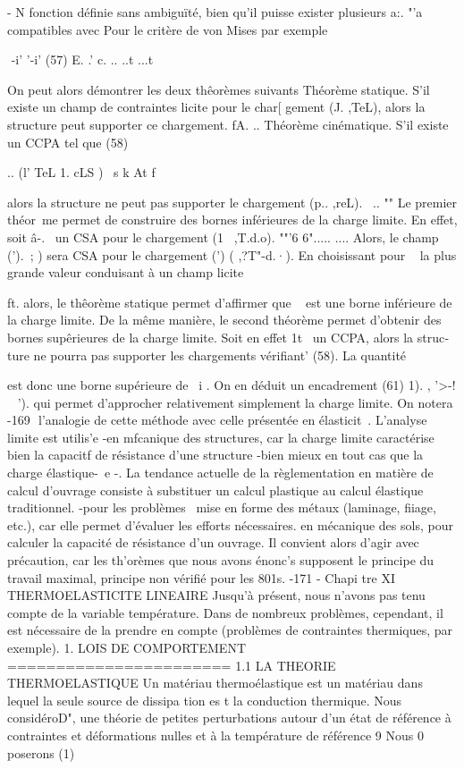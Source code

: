 {{{{{{{{{{{{{{{{-
N
fonction définie sans ambiguïté, bien qu'il puisse exister plusieurs a:. 
"'a
compatibles avec Pour le critère de von Mises par exemple 

 -i' '-i'
(57) 
E. .' c. .. 
..t ...t 

On peut alors démontrer les deux thêorèmes suivants 
Théorème statique. S'il existe un champ de contraintes licite pour le char­[ gement (J. ,TeL), alors la structure peut supporter ce chargement.
fA. .. 
Théorème cinématique. S'il existe un CCPA tel que 
(58) 

.. (l' TeL 1. cLS )
~s k At 
f 

alors la structure ne peut pas supporter le chargement (p.. ,reL). 
~.. "" 
Le premier théor~me permet de construire des bornes inférieures de la charge limite. En effet, soit â-.~ un CSA pour le chargement (1~ ,T.d.o).
""'6 6"..... .... 
Alors, le champ (').~; ) sera CSA pour le chargement (') ( ,?T"-d.·). En choisissant pour ~ la plus grande valeur conduisant à un champ licite 

ft. 
alors, le thêorème statique permet d'affirmer que ~ est une borne inférieu­re de la charge limite. 
De la même manière, le second théorème permet d'obtenir des bornes supêrieures de la charge limite. Soit en effet 1t~ un CCPA, alors la struc­ture ne pourra pas supporter les chargements vérifiant' (58). La quantité 

est donc une borne supérieure de ~i . On en déduit un encadrement 
(61) 1). , '>-! ~ '). 
qui permet d'approcher relativement simplement la charge limite. On notera 
-169 ­
l'analogie de cette méthode avec celle présentée en élasticit~. 
L'analyse limite est utilis'e 
-en mfcanique des structures, car la charge limite caractérise bien la capacitf de résistance d'une structure -bien mieux en tout cas que la charge élastique-~e -. La tendance actuelle de la règlementation en matiè­re de calcul d'ouvrage consiste à substituer un calcul plastique au calcul élastique traditionnel. 
-pour les problèmes ~mise en forme des métaux (laminage, fiiage, etc.), car elle permet d'évaluer les efforts nécessaires. 
en mécanique des sols, pour calculer la capacité de résistance d'un ouvrage. Il convient alors d'agir avec précaution, car les th'orèmes que nous avons énonc's supposent le principe du travail maximal, principe non vérifié pour les 801s. 
-171 -
Chapi tre XI 
THERMOELASTICITE LINEAIRE 
Jusqu'à présent, nous n'avons pas tenu compte de la variable température. Dans de nombreux problèmes, cependant, il est nécessaire de la prendre en compte (problèmes de contraintes thermiques, par exemple). 
1. LOIS DE COMPORTEMENT 
======================= 
1.1 LA THEORIE THERMOELASTIQUE 
Un matériau thermoélastique est un matériau dans lequel la seule source de dissipa tion es t la conduction thermique. Nous considéroD", une théorie de petites perturbations autour d'un état de référence à contrain­tes et déformations nulles et à la température de référence 9 Nous
0 
poserons 
(1) 

}}}}}}}}}}}}}}}}

